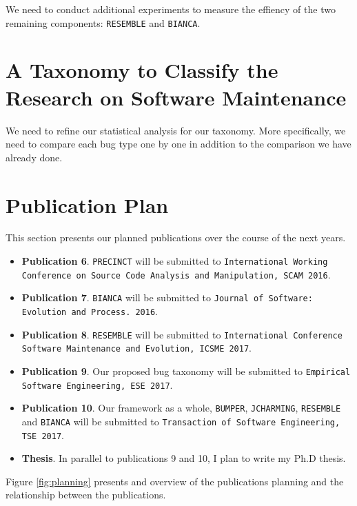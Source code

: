 We need to conduct additional experiments to measure the effiency of the two remaining components: {\tt RESEMBLE} and {\tt BIANCA}.

\section{A Taxonomy to Classify the Research on Software Maintenance}

We need to refine our statistical analysis for our taxonomy.
More specifically, we need to compare each bug type one by one in addition to the comparison we have already done.

\section{Publication Plan\label{sec:publication-plan}}

This section presents our planned publications over the course of the next years.

\begin{itemize}
	\item {\bf Publication 6}. {\tt PRECINCT} will be submitted to {\tt International Working Conference on Source Code Analysis and Manipulation, SCAM 2016}.
	\item {\bf Publication 7}. {\tt BIANCA} will be submitted to {\tt Journal of Software: Evolution and Process. 2016}.
	\item {\bf Publication 8}. {\tt RESEMBLE} will be submitted to {\tt International Conference Software Maintenance and Evolution, ICSME 2017}.
	\item {\bf Publication 9}. Our proposed bug taxonomy will be submitted to {\tt Empirical Software Engineering, ESE 2017}.
	\item {\bf Publication 10}. Our framework as a whole, {\tt BUMPER}, {\tt JCHARMING}, {\tt RESEMBLE} and {\tt BIANCA} will be submitted to {\tt Transaction of Software Engineering, TSE 2017}.
	\item {\bf Thesis}. In parallel to publications 9 and 10, I plan to write my Ph.D thesis.
\end{itemize}

Figure \ref{fig:planning} presents and overview of the publications planning and the relationship between the publications.

